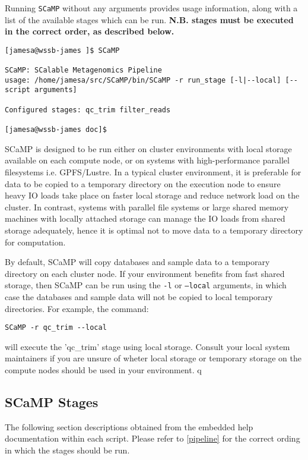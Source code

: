 \documentclass[a4paper,10pt]{article}
\begin{document}
Running {\tt SCaMP} without any arguments provides usage information, along
with a list of the available stages which can be run. \textbf{N.B. stages must
be executed in the correct order, as described below.}

\begin{verbatim}
[jamesa@wssb-james ]$ SCaMP 

SCaMP: SCalable Metagenomics Pipeline
usage: /home/jamesa/src/SCaMP/bin/SCaMP -r run_stage [-l|--local] [-- script arguments]

Configured stages: qc_trim filter_reads

[jamesa@wssb-james doc]$ 
\end{verbatim}

SCaMP is designed to be run  either on cluster environments with local storage
available on each compute node, or on systems with high-performance parallel
filesystems i.e. GPFS/Lustre. In a typical cluster environment, it is
preferable for data to be copied to a temporary directory on the execution node
to ensure heavy IO loads take place on faster local storage and reduce network
load on the cluster. In contrast, systems with parallel file systems or large
shared memory machines with locally attached storage can manage the IO loads
from shared storage adequately, hence it is optimal not to move data to a
temporary directory for computation.

By default, SCaMP will copy databases and sample data to a temporary directory
on each cluster node. If your environment benefits from fast shared storage,
then SCaMP can be run using the {\tt -l} or {\tt --local} arguments, in which
case the databases and sample data will not be copied to local temporary
directories. For example, the command:

\begin{verbatim}
SCaMP -r qc_trim --local
\end{verbatim}

will execute the 'qc\_trim' stage using local storage. Consult your local
system maintainers if you are unsure of wheter local storage or temporary
storage on the compute nodes should be used in your environment. 
q
\subsection{SCaMP Stages}

The following section descriptions obtained from the embedded help
documentation within each script. Please refer to \ref{pipeline} for the
correct ording in which the stages should be run.



\end{document}
